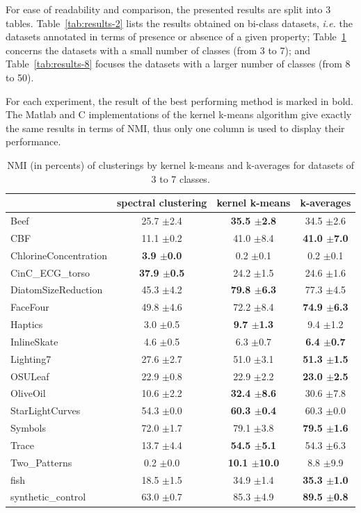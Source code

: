 \documentclass[natbib,smallextended]{svjour3}
\begin{document}
For ease of readability and comparison, the presented results are split into 3 tables. Table~\ref{tab:results-2} lists the results obtained on bi-class datasets, \textit{i.e.} the datasets annotated in terms of presence or absence of a given property; Table~\ref{tab:results-37} concerns the datasets with a small number of classes (from 3 to 7); and Table~\ref{tab:results-8} focuses the datasets with a larger number of classes (from 8 to 50).

For each experiment, the result of the best performing method is marked in bold. The Matlab and C implementations of the kernel k-means algorithm give exactly the same results in terms of NMI, thus only one column is used to display their performance.


\begin{table}
\begin{center}
\caption{NMI (in percents) of clusterings by kernel k-means and k-averages for datasets of 3 to 7 classes.}
\label{tab:results-37}
\begin{tabular}{lccc}
 & spectral clustering & kernel k-means & k-averages \\
\hline
Beef & 25.7 $\pm$2.4 & \textbf{35.5 $\pm$2.8} & 34.5 $\pm$2.6 \\
CBF & 11.1 $\pm$0.2 & 41.0 $\pm$8.4 & \textbf{41.0 $\pm$7.0} \\
ChlorineConcentration & \textbf{3.9 $\pm$0.0} & 0.2 $\pm$0.1 & 0.2 $\pm$0.1 \\
CinC\_ECG\_torso & \textbf{37.9 $\pm$0.5} & 24.2 $\pm$1.5 & 24.6 $\pm$1.6 \\
DiatomSizeReduction & 45.3 $\pm$4.2 & \textbf{79.8 $\pm$6.3} & 77.3 $\pm$4.5 \\
FaceFour & 49.8 $\pm$4.6 & 72.2 $\pm$8.4 & \textbf{74.9 $\pm$6.3} \\
Haptics & 3.0 $\pm$0.5 & \textbf{9.7 $\pm$1.3} & 9.4 $\pm$1.2 \\
InlineSkate & 4.6 $\pm$0.5 & 6.3 $\pm$0.7 & \textbf{6.4 $\pm$0.7} \\
Lighting7 & 27.6 $\pm$2.7 & 51.0 $\pm$3.1 & \textbf{51.3 $\pm$1.5} \\
OSULeaf & 22.9 $\pm$0.8 & 22.9 $\pm$2.2 & \textbf{23.0 $\pm$2.5} \\
OliveOil & 10.6 $\pm$2.2 & \textbf{32.4 $\pm$8.6} & 30.6 $\pm$7.8 \\
StarLightCurves & 54.3 $\pm$0.0 & \textbf{60.3 $\pm$0.4} & 60.3 $\pm$0.0 \\
Symbols & 72.0 $\pm$1.7 & 79.1 $\pm$3.8 & \textbf{79.5 $\pm$1.6} \\
Trace & 13.7 $\pm$4.4 & \textbf{54.5 $\pm$5.1} & 54.3 $\pm$6.3 \\
Two\_Patterns &   0.2 $\pm$0.0 & \textbf{10.1 $\pm$10.0} &   8.8 $\pm$9.9 \\
fish & 18.5 $\pm$1.5 & 34.9 $\pm$1.4 & \textbf{35.3 $\pm$1.0} \\
synthetic\_control & 63.0 $\pm$0.7 & 85.3 $\pm$4.9 & \textbf{89.5 $\pm$0.8} \\
\end{tabular}
\end{center}
\end{table}
\end{document}

